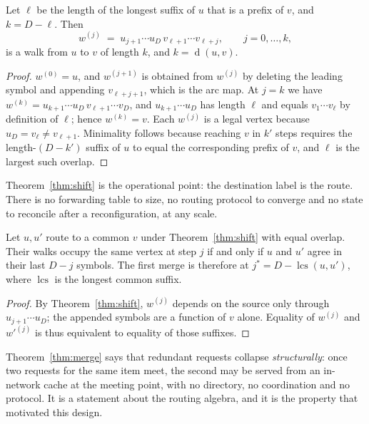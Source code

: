 \documentclass[sigconf,nonacm]{acmart}
\theoremstyle{acmdefinition}%
\newcommand{\dist}{\operatorname{d}}
\newcommand{\lcs}{\operatorname{lcs}}
\begin{document}
\begin{theorem}
\label{thm:shift}
Let $\ell$ be the length of the longest suffix of $u$ that is a prefix of $v$,
and $k=D-\ell$. Then
\[
  w^{(j)} \;=\; u_{j+1}\cdots u_D\, v_{\ell+1}\cdots v_{\ell+j},
  \qquad j=0,\dots,k,
\]
is a walk from $u$ to $v$ of length $k$, and $k=\dist(u,v)$.
\end{theorem}

\begin{proof}
$w^{(0)}=u$, and $w^{(j+1)}$ is obtained from $w^{(j)}$ by deleting the leading
symbol and appending $v_{\ell+j+1}$, which is the arc map. At $j=k$ we have
$w^{(k)} = u_{k+1}\cdots u_D\,v_{\ell+1}\cdots v_D$, and $u_{k+1}\cdots u_D$ has
length $\ell$ and equals $v_1\cdots v_\ell$ by definition of $\ell$; hence
$w^{(k)}=v$. Each $w^{(j)}$ is a legal vertex because $u_D=v_\ell \ne
v_{\ell+1}$. Minimality follows because reaching $v$ in $k'$ steps requires the
length-$(D-k')$ suffix of $u$ to equal the corresponding prefix of $v$, and
$\ell$ is the largest such overlap.
\end{proof}

Theorem~\ref{thm:shift} is the operational point: the destination label is the
route. There is no forwarding table to size, no routing protocol to converge and
no state to reconcile after a reconfiguration, at any scale.

\begin{theorem}
\label{thm:merge}
Let $u,u'$ route to a common $v$ under Theorem~\ref{thm:shift} with equal
overlap. Their walks occupy the same vertex at step $j$ if and only if $u$ and
$u'$ agree in their last $D-j$ symbols. The first merge is therefore at
$j^\ast = D-\lcs(u,u')$, where $\lcs$ is the longest common suffix.
\end{theorem}

\begin{proof}
By Theorem~\ref{thm:shift}, $w^{(j)}$ depends on the source only through
$u_{j+1}\cdots u_D$; the appended symbols are a function of $v$ alone. Equality
of $w^{(j)}$ and $w'^{(j)}$ is thus equivalent to equality of those suffixes.
\end{proof}

Theorem~\ref{thm:merge} says that redundant requests collapse
\emph{structurally}: once two requests for the same item meet, the second may be
served from an in-network cache at the meeting point, with no directory, no
coordination and no protocol. It is a statement about the routing algebra, and
it is the property that motivated this design.
\end{document}
